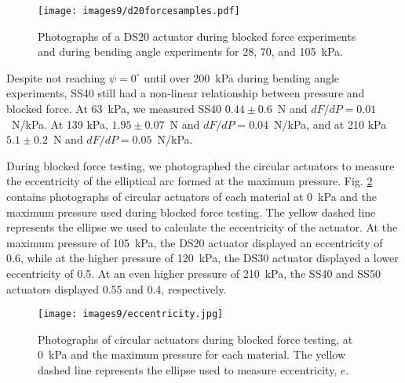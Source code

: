 \begin{figure}[!ht]
    \centering
     \texttt{[image: images9/d20forcesamples.pdf]}
    \caption{Photographs of a DS20 actuator during blocked force experiments and during bending angle experiments for 28, 70, and 105~kPa.}
    \label{fig:d20force}
\end{figure}

Despite not reaching $\psi=0^\circ$ until over 200~kPa during bending angle experiments, SS40 still had a non-linear relationship between pressure and blocked force. At 63~kPa, we measured SS40 $0.44\pm0.6$~N and $dF/dP=0.01$~N/kPa. At 139 kPa, $1.95\pm0.07$~N and $dF/dP=0.04$~N/kPa, and at 210 kPa $5.1\pm0.2$~N and $dF/dP=0.05$~N/kPa. 

\clearpage
During blocked force testing, we photographed the circular actuators to measure the eccentricity of the elliptical arc formed at the maximum pressure. Fig. \ref{fig:eccentricity} contains photographs of circular actuators of each material at 0~kPa and the maximum pressure used during blocked force testing. The yellow dashed line represents the ellipse we used to calculate the eccentricity of the actuator. At the maximum pressure of 105~kPa, the DS20 actuator displayed an eccentricity of 0.6, while at the higher pressure of 120~kPa, the DS30 actuator displayed a lower eccentricity of 0.5. At an even higher pressure of 210~kPa, the SS40 and SS50 actuators displayed 0.55 and 0.4, respectively. 
\\
\begin{figure}[!ht]
    \centering
     \texttt{[image: images9/eccentricity.jpg]}
    \caption{Photographs of circular actuators during blocked force testing, at 0~kPa and the maximum pressure for each material. The yellow dashed line represents the ellipse used to measure eccentricity, $e$.}
    \label{fig:eccentricity}
\end{figure}